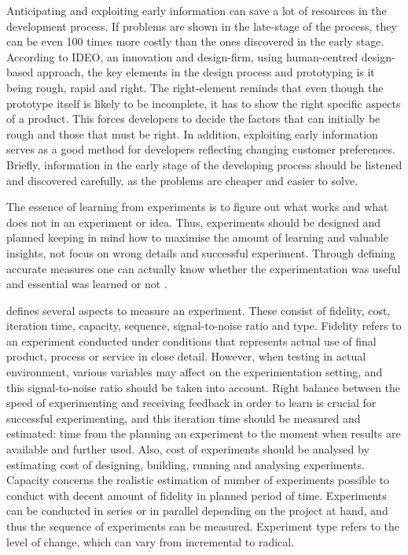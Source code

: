 Anticipating and exploiting early information can save a lot of resources in the development process. If problems are shown in the late-stage of the process, they can be even 100 times more costly than the ones discovered in the early stage. According to IDEO, an innovation and design-firm, using human-centred design-based approach, the key elements in the design process and prototyping is it being rough, rapid and right. The right-element reminds that even though the prototype itself is likely to be incomplete, it has to show the right specific aspects of a product. This forces developers to decide the factors that can initially be rough and those that must be right. In addition, exploiting early information serves as a good method for developers reflecting changing customer preferences. Briefly, information in the early stage of the developing process should be listened and discovered carefully, as the problems are cheaper and easier to solve. \citep{thomke2001enlightened}

The essence of learning from experiments is to figure out what works and what does not in an experiment or idea. Thus, experiments should be designed and planned keeping in mind how to maximise the amount of learning and valuable insights, not focus on wrong details and successful experiment. Through defining accurate measures one can actually know whether the experimentation was useful and essential was learned or not \citep{thomke2003r}. 

\citet{thomke2003r} defines several aspects to measure an experiment. These consist of fidelity, cost, iteration time, capacity, sequence, signal-to-noise ratio and type. Fidelity refers to an experiment conducted under conditions that represents actual use of final product, process or service in close detail. However, when testing in actual environment, various variables may affect on the experimentation setting, and this signal-to-noise ratio should be taken into account. Right balance between the speed of experimenting and receiving feedback in order to learn is crucial for successful experimenting, and this iteration time should be measured and estimated: time from the planning an experiment to the moment when results are available and further used. Also, cost of experiments should be analysed by estimating cost of designing, building, running and analysing experiments. Capacity concerns the realistic estimation of number of experiments possible to conduct with decent amount of fidelity in planned period of time. Experiments can be conducted in series or in parallel depending on the project at hand, and thus the sequence of experiments can be measured. Experiment type refers to the level of change, which can vary from incremental to radical. \citep{thomke2003r}

